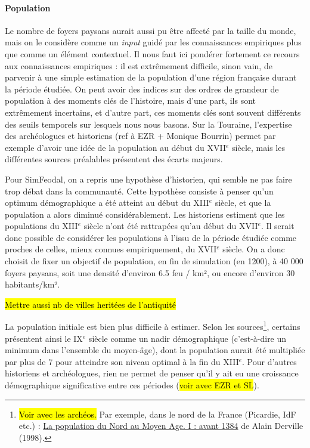 \paragraph{Population}
Le nombre de foyers paysans aurait aussi pu être affecté par la taille du monde, mais on le considère comme un \textit{input} guidé par les connaissances empiriques plus que comme un élément contextuel.
Il nous faut ici pondérer fortement ce recours aux connaissances empiriques : il est extrêmement difficile, sinon vain, de parvenir à une simple estimation de la population d'une région française durant la période étudiée.
On peut avoir des indices sur des ordres de grandeur de population à des moments clés de l'histoire, mais d'une part, ils sont extrêmement incertains, et d'autre part, ces moments clés sont souvent différents des seuils temporels sur lesquels nous nous basons.
Sur la Touraine, l'expertise des archéologues et historiens (ref à EZR + Monique Bourrin) permet par exemple d'avoir une idée de la population au début du XVII$^e$ siècle, mais les différentes sources préalables présentent des écarts majeurs.

Pour SimFeodal, on a repris une hypothèse d'historien, qui semble ne pas faire trop débat dans la communauté.
Cette hypothèse consiste à penser qu'un optimum démographique a été atteint au début du XIII$^e$ siècle, et que la population a alors diminué considérablement.
Les historiens estiment que les populations du XIII$^e$ siècle n'ont été rattrapées qu'au début du XVII$^e$.
Il serait donc possible de considérer les populations à l'issu de la période étudiée comme proches de celles, mieux connues empiriquement, du XVII$^e$ siècle.
On a donc choisit de fixer un objectif de population, en fin de simulation (en 1200), à 40 000 foyers paysans, soit une densité d'environ 6.5 feu / km², ou encore d'environ 30 habitants/km².

\hl{Mettre aussi nb de villes heritées de l'antiquité}

La population initiale est bien plus difficile à estimer.
Selon les sources\footnote{
	\hl{Voir avec les archéos.}
	Par exemple, dans le nord de la France (Picardie, IdF etc.) :  \og \href{https://www.persee.fr/doc/rnord_0035-2624_1998_num_80_326_2872}{La population du Nord au Moyen Age. I : avant 1384}\fg{} de Alain Derville (1998).
}, certains présentent ainsi le IX$^e$ siècle comme un \og nadir\fg{} démographique (c'est-à-dire un minimum dans l'ensemble du moyen-âge), dont la population aurait été multipliée par plus de 7 pour atteindre son niveau optimal à la fin du XIII$^e$.
Pour d'autres historiens et archéologues, rien ne permet de penser qu'il y ait eu une croissance démographique significative entre ces périodes (\hl{voir avec EZR et SL}).

